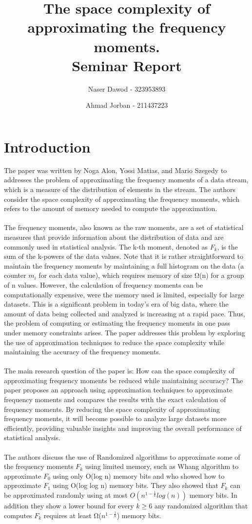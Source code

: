 \documentclass{article}
\title{The space complexity of approximating the frequency moments. \\ \myfont Seminar Report}
\author{Naser Dawod - 323953893 \and Ahmad Jorban - 211437223}
\date{}
\begin{document}
\maketitle
\large
\section{Introduction}
The paper was written by Noga Alon, Yossi Matias, and Mario Szegedy to addresses the problem of approximating the frequency moments of a data stream, which is a measure of the distribution of elements in the stream. The authors consider the space complexity of approximating the frequency moments, which refers to the amount of memory needed to compute the approximation.
\\ \\
The frequency moments, also known as the raw moments, are a set of statistical measures that provide information about the distribution of data and are commonly used in statistical analysis. The k-th moment, denoted as \(F_{k}\), is the sum of the k-powers of the data values. Note that it is rather straightforward to maintain the frequency moments by maintaining a full histogram on the data (a counter \(m_{i}\) for each data value), which requires memory of size Ω(n) for a group of n values. However, the calculation of frequency moments can be computationally expensive, were the memory used is limited, especially for large datasets. This is a significant problem in today's era of big data, where the amount of data being collected and analyzed is increasing at a rapid pace. Thus, the problem of computing or estimating the frequency moments in one pass under memory constraints arises. The paper addresses this problem by exploring the use of approximation techniques to reduce the space complexity while maintaining the accuracy of the frequency moments.
\\ \\ 
The main research question of the paper is: How can the space complexity of approximating frequency moments be reduced while maintaining accuracy? The paper proposes an approach using approximation techniques to approximate frequency moments and compares the results with the exact calculation of frequency moments. By reducing the space complexity of approximating frequency moments, it will become possible to analyze large datasets more efficiently, providing valuable insights and improving the overall performance of statistical analysis.
\\ \\ 
The authors discuss the use of Randomized algorithms to approximate some of the frequency moments \(F_{k}\) using limited memory, such as Whang algorithm to approximate \(F_{0}\) using only O(log n) memory bits and who showed how to approximate \(F_{1}\) using O(log log n) memory bits. They also showed that \(F_{k}\) can be approximated randomly using at most
\(O(n^{1 - \frac{1}{k}}log(n))\) memory bits. In addition they show a lower bound for every \(k \geq 6\) any randomized algorithm that computes \(F_{k}\) requires at least Ω(\(n^{1 - \frac{1}{k}}\)) memory bits.
\end{document}
